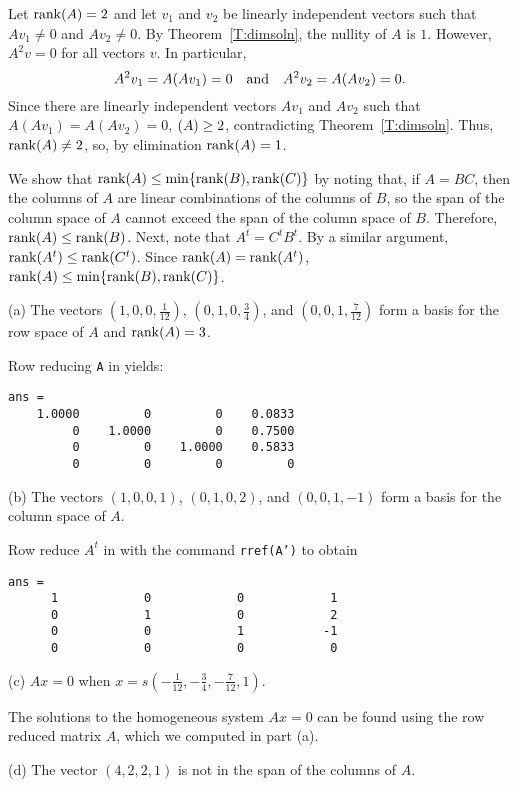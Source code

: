 \para Let ${\rm rank}(A) = 2$ and let $v_1$ and $v_2$ be linearly independent
vectors such that $Av_1 \neq 0$ and $Av_2 \neq 0$.  By
Theorem~\ref{T:dimsoln}, the nullity of $A$ is $1$.  However,
$A^2v = 0$ for all vectors $v$.  In particular,
\[
A^2v_1 = A(Av_1) = 0 \quad\mbox{and}\quad A^2v_2 = A(Av_2) = 0.
\]
Since there are linearly independent vectors $Av_1$ and $Av_2$ such
that $A(Av_1) = A(Av_2) = 0$, $\null(A) \geq 2$, contradicting
Theorem~\ref{T:dimsoln}.  Thus, ${\rm rank}(A) \neq 2$, so, by elimination
${\rm rank}(A) = 1$.

We show that ${\rm rank}(A) \leq \min\{{\rm rank}(B),{\rm rank}(C)\}$ by noting that,
if $A = BC$, then the columns of $A$ are linear combinations of the
columns of $B$, so the span of the column space of $A$ cannot exceed
the span of the column space of $B$.  Therefore, ${\rm rank}(A) \leq
{\rm rank}(B)$.  Next, note that $A^t = C^tB^t$.  By a similar argument,
${\rm rank}(A^t) \leq {\rm rank}(C^t)$.  Since ${\rm rank}(A) = {\rm rank}(A^t)$,
${\rm rank}(A) \leq \min\{{\rm rank}(B),{\rm rank}(C)\}$.

(a) \ans The vectors $(1,0,0,\frac{1}{12})$, $(0,1,0,\frac{3}{4})$,
and $(0,0,1,\frac{7}{12})$ form a basis for the row space of $A$ and
${\rm rank}(A) = 3$.

\soln Row reducing {\tt A} in \Matlab yields:
\begin{verbatim}
ans =
    1.0000         0         0    0.0833
         0    1.0000         0    0.7500
         0         0    1.0000    0.5833
         0         0         0         0
\end{verbatim}

(b) \ans The vectors $(1,0,0,1)$, $(0,1,0,2)$, and $(0,0,1,-1)$ form a
basis for the column space of $A$.

\soln Row reduce $A^t$ in \Matlab with the command {\tt rref(A')} to obtain
\begin{verbatim}
ans =
      1            0            0            1      
      0            1            0            2      
      0            0            1           -1      
      0            0            0            0      
\end{verbatim}

(c) \ans $Ax = 0$ when $x = s(-\frac{1}{12},-\frac{3}{4}, -\frac{7}{12},1)$.

\soln The solutions to the homogeneous system $Ax = 0$ can be found
using the row reduced matrix $A$, which we computed in part (a).

(d) \ans The vector $(4,2,2,1)$ is not in the span of the columns of
$A$.

